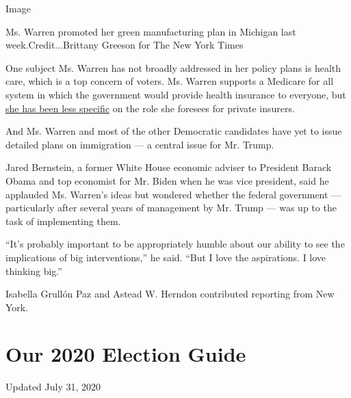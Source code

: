 Image

Ms. Warren promoted her green manufacturing plan in Michigan last
week.Credit...Brittany Greeson for The New York Times

One subject Ms. Warren has not broadly addressed in her policy plans is
health care, which is a top concern of voters. Ms. Warren supports a
Medicare for all system in which the government would provide health
insurance to everyone, but
\href{https://www.nytimes3xbfgragh.onion/2019/02/02/us/politics/medicare-for-all-2020.html}{she
has been less specific} on the role she foresees for private insurers.

And Ms. Warren and most of the other Democratic candidates have yet to
issue detailed plans on immigration --- a central issue for Mr. Trump.

Jared Bernstein, a former White House economic adviser to President
Barack Obama and top economist for Mr. Biden when he was vice president,
said he applauded Ms. Warren's ideas but wondered whether the federal
government --- particularly after several years of management by Mr.
Trump --- was up to the task of implementing them.

``It's probably important to be appropriately humble about our ability
to see the implications of big interventions,'' he said. ``But I love
the aspirations. I love thinking big.''

Isabella Grullón Paz and Astead W. Herndon contributed reporting from
New York.

\hypertarget{our-2020-election-guide}{%
\section{Our 2020 Election Guide}\label{our-2020-election-guide}}

Updated July 31, 2020

